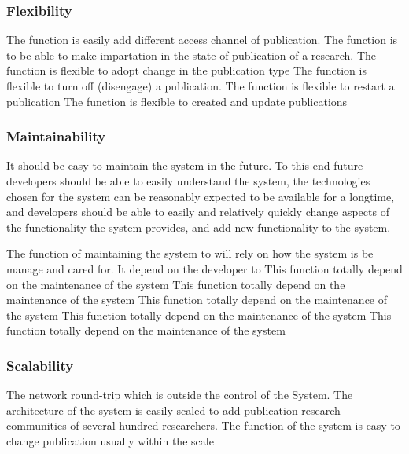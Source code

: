 \subsubsection{Flexibility}
 The function is easily add different access channel of publication.
 The function is to be able to make impartation in the state of publication of a research.
 The function is flexible to adopt change in the publication type 
 The function is flexible to turn off (disengage) a publication.
 The function is flexible to restart a publication
 The function is flexible to created and update publications

\subsubsection{Maintainability}
It should be easy to maintain the system in the future. To this end future developers should be able to easily understand the system, the technologies chosen for the system can be reasonably expected to be available for a longtime, and developers should be able to easily and relatively quickly change aspects of the functionality the system provides, and add new functionality to the system.

 The function of maintaining the system to will rely on how the system is be manage and cared for.  It depend on the developer to
 This function totally depend on the maintenance of the system 
 This function totally depend on the maintenance of the system
 This function totally depend on the maintenance of the system
 This function totally depend on the maintenance of the system
 This function totally depend on the maintenance of the system

\subsubsection{Scalability} The network round-trip which is outside the control of the System.
 The architecture of the system is easily scaled to add publication research communities of several hundred researchers. 
 The function of the system is easy to change publication usually within the scale

